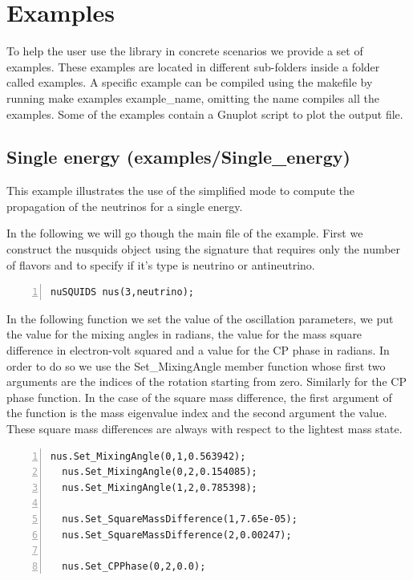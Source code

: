 \documentclass[3p,12pt]{elsarticle}
\newcommand{\ttf}{\ttfamily}
\begin{document}
\section{Examples}
\label{sec:examples}
To help the user use the library in concrete scenarios we provide
a set of examples. These examples are located in different sub-folders inside a folder
called {\ttf examples}. A specific example can be compiled using the
makefile by running {\ttf make examples example\_name}, omitting the
name compiles all the examples. 
Some of the examples contain a {\ttf Gnuplot} script to plot the output file.

\subsection{Single energy \textnormal{({\ttf examples/Single\_energy})}}
\label{sec:single}
This example illustrates the use of the simplified mode to compute the
propagation of the neutrinos for a single energy. 

In the following we will go though the main file of the example.
First we construct the nusquids object using the signature that
requires only the number of flavors and to specify if it's type is
neutrino or antineutrino.

\begin{lstlisting}[frame=leftline, numbers = left,breaklines=true, label = ex:sin1]
  nuSQUIDS nus(3,neutrino);
\end{lstlisting}

In the following function we set the value of the oscillation parameters, we put
the value for the mixing angles in radians, the value for the mass
square difference in electron-volt squared and a value for the CP
phase in radians.
In order to do so we use the {\ttf Set\_MixingAngle} member function
whose first two arguments are the indices of the rotation  starting
from zero. Similarly for the CP phase function.
In the case of the square mass difference, the first argument of the function is
the mass eigenvalue index and the second argument the value. These
square mass differences are always with respect to the lightest mass state.
 
\begin{lstlisting}[frame=leftline, numbers = left,breaklines=true, label = ex:sin1,firstnumber=last]
  nus.Set_MixingAngle(0,1,0.563942);
  nus.Set_MixingAngle(0,2,0.154085);
  nus.Set_MixingAngle(1,2,0.785398);

  nus.Set_SquareMassDifference(1,7.65e-05);
  nus.Set_SquareMassDifference(2,0.00247);

  nus.Set_CPPhase(0,2,0.0);
\end{lstlisting}
\end{document}
